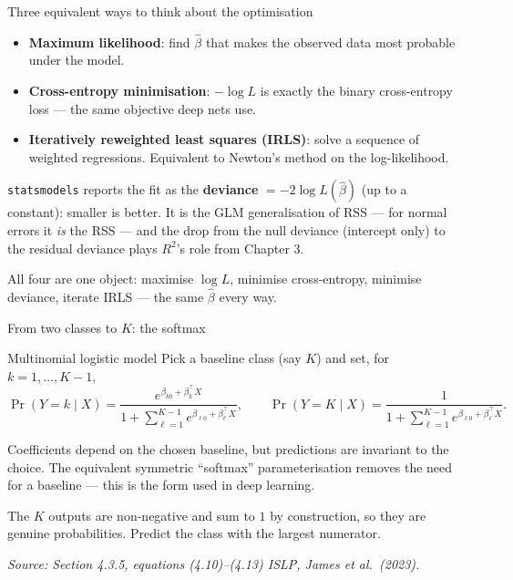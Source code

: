 \documentclass[aspectratio=169,11pt]{beamer}
\newcommand{\islpsource}[1]{%
  \vfill\hfill{\tiny\itshape\color{gray}Source: #1 \textemdash{} ISLP, James et al.\ (2023).}\par
}
\begin{document}
\begin{frame}{Three equivalent ways to think about the optimisation}
  \footnotesize
  \begin{itemize}\itemsep1pt
    \item \textbf{Maximum likelihood}: find $\hat\beta$ that makes the
          observed data most probable under the model.
    \item \textbf{Cross-entropy minimisation}: $-\log L$ is exactly the
          binary cross-entropy loss --- the same objective deep nets use.
    \item \textbf{Iteratively reweighted least squares (IRLS)}: solve a
          sequence of weighted regressions. Equivalent to Newton's
          method on the log-likelihood.
  \end{itemize}
  \begin{readme}
    \texttt{statsmodels} reports the fit as the \textbf{deviance}
    $=-2\log L(\hat\beta)$ (up to a constant): smaller is better. It is
    the GLM generalisation of RSS --- for normal errors it \emph{is} the
    RSS --- and the drop from the null deviance (intercept only) to the
    residual deviance plays $R^2$'s role from Chapter 3.
  \end{readme}
  \begin{takeaway}
    All four are one object: maximise $\log L$, minimise cross-entropy,
    minimise deviance, iterate IRLS --- the same $\hat\beta$ every way.
  \end{takeaway}
\end{frame}

\begin{frame}{From two classes to $K$: the softmax}
  \small
  \begin{block}{Multinomial logistic model}
    Pick a baseline class (say $K$) and set, for $k = 1,\dots,K-1$,
    \[
      \Pr(Y = k \mid X)
      = \frac{e^{\beta_{k0} + \beta_{k}^\top X}}
             {1 + \sum_{\ell=1}^{K-1} e^{\beta_{\ell 0} + \beta_\ell^\top X}},
      \qquad
      \Pr(Y = K \mid X)
      = \frac{1}
             {1 + \sum_{\ell=1}^{K-1} e^{\beta_{\ell 0} + \beta_\ell^\top X}}.
    \]
  \end{block}
  \begin{readme}
    Coefficients depend on the chosen baseline, but predictions are
    invariant to the choice. The equivalent symmetric ``softmax''
    parameterisation removes the need for a baseline --- this is the
    form used in deep learning.
  \end{readme}
  \begin{takeaway}
    The $K$ outputs are non-negative and sum to $1$ by construction, so
    they are genuine probabilities. Predict the class with the largest
    numerator.
  \end{takeaway}
  \islpsource{Section 4.3.5, equations (4.10)--(4.13)}
\end{frame}
\end{document}
